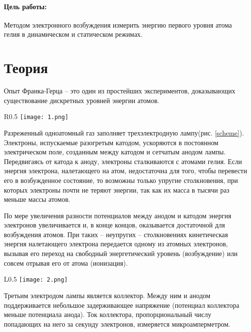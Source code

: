 \documentclass{physlab}
\begin{document}


\paragraph{Цель работы:} Методом электронного возбуждения измерить энергию первого уровня атома гелия в динамическом и статическом режимах.

\section{Теория}
Опыт Франка-Герца -- это один из простейших экспериментов, доказывающих существование дискретных уровней энергии атомов.

\begin{wrapfigure}{R}{0.5\linewidth}
\centering
    \texttt{[image: 1.png]}
\caption{Принципиальная схема опыта}
\label{scheme} 
\end{wrapfigure}

Разреженный одноатомный газ заполняет трехэлектродную лампу(рис. \ref{scheme}).  Электроны, испускаемые разогретым катодом, ускоряются в постоянном электрическом поле, созданным между катодом и сетчатым анодом лампы. Передвигаясь от катода к аноду, электроны сталкиваются с атомами гелия. Если энергия электрона, налетающего на атом, недостаточна для того, чтобы перевести его в возбужденное состояние, то возможны только упругие столкновения, при которых электроны почти не теряют энергии, так как их масса в тысячи раз меньше массы атомов. 


По мере увеличения разности потенциалов между анодом и катодом энергия электронов увеличивается и, в конце концов, оказывается достаточной для возбуждения атомов. При таких -- неупругих -- столкновениях кинетическая энергия налетающего электрона передается одному из атомных электронов, вызывая его переход на свободный энергетический уровень (возбуждение) или совсем отрывая его от атома (ионизация).

\begin{wrapfigure}[12]{L}{0.5\linewidth} 
\centering
    \texttt{[image: 2.png]}
\caption{Зависимость тока коллектора от напряжения на аноде}
\label{dependency}
\end{wrapfigure}

Третьим электродом лампы является коллектор. Между ним и анодом поддерживается небольшое задерживающее напряжение (потенциал коллектора меньше потенциала анода). Ток коллектора, пропорциональный числу попадающих на него за секунду электронов, измеряется микроамперметром.
\end{document}
